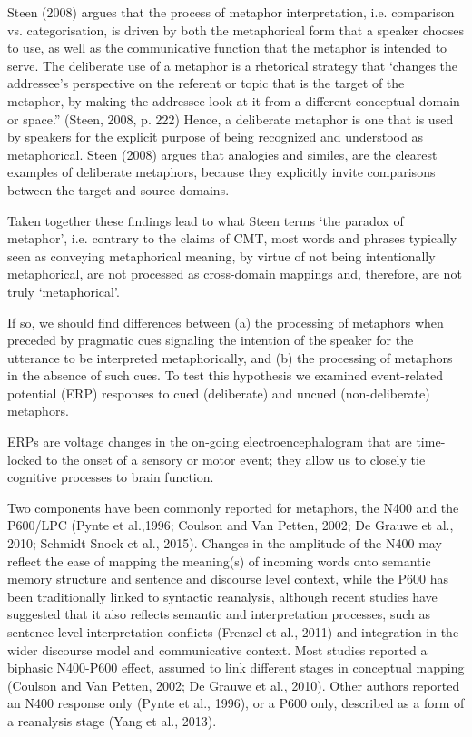 \documentclass[]{article}
\begin{document}
	Steen (2008) argues that the process of metaphor interpretation, i.e. comparison vs. categorisation, is driven by both the metaphorical form that a speaker chooses to use, as well as the communicative function that the metaphor is intended to serve.
	The deliberate use of a metaphor is a rhetorical strategy that ‘changes the addressee’s perspective on the referent or topic that is the target of the metaphor, by making the addressee look at it from a different conceptual domain or space.” (Steen, 2008, p. 222)
	Hence, a deliberate metaphor is one that is used by speakers for the explicit purpose of being recognized and understood as metaphorical.
	Steen (2008) argues that analogies and similes, are the clearest examples of deliberate metaphors, because they explicitly invite comparisons between the target and source domains. 
	
	Taken together these findings lead to what Steen terms ‘the paradox of metaphor’, i.e. contrary to the claims of CMT, most words and phrases typically seen as conveying metaphorical meaning, by virtue of not being intentionally metaphorical, are not processed as cross-domain mappings and, therefore, are not truly ‘metaphorical’. 
	
	If so, we should find differences between (a) the processing of metaphors when preceded by pragmatic cues signaling the intention of the speaker for the utterance to be interpreted metaphorically, and (b) the processing of metaphors in the absence of such cues. 
	To test this hypothesis we examined event-related potential (ERP) responses to cued (deliberate) and uncued (non-deliberate) metaphors.
	
	ERPs are voltage changes in the on-going electroencephalogram that are time-locked to the onset of a sensory or motor event; they allow us to closely tie cognitive processes to brain function.
	
	Two components have been commonly reported for metaphors, the N400 and  the P600/LPC (Pynte et al.,1996; Coulson and Van Petten, 2002; De Grauwe et al., 2010; Schmidt-Snoek et al., 2015).
	Changes in the amplitude of the N400 may reflect the ease of mapping the meaning(s) of incoming words onto semantic memory structure and sentence and discourse level context, while the P600 has been traditionally linked to syntactic reanalysis, although recent studies have suggested that it also reflects semantic and interpretation processes, such as sentence-level interpretation conflicts (Frenzel et al., 2011) and integration in the wider discourse model and communicative context.
	Most studies reported a biphasic N400-P600 effect, assumed to link different stages in conceptual mapping (Coulson and Van Petten, 2002; De Grauwe et al., 2010). Other authors reported an N400 response only (Pynte et al., 1996), or a P600 only, described as a form of a reanalysis stage (Yang et al., 2013).
	
\end{document}
